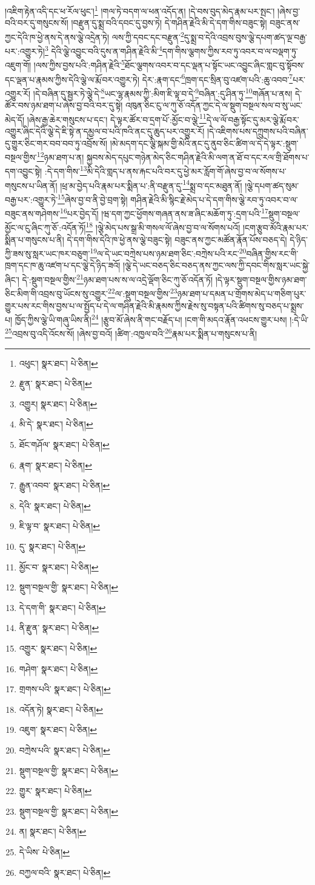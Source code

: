 །འཇིག་རྟེན་འདི་དང་ཕ་རོལ་ཕུང་།\footnote{འཕུང་།  སྣར་ཐང་།  པེ་ཅིན། } །གལ་ཏེ་བདག་ལ་ཕན་འདོད་ན། །དེ་བས་བུད་མེད་རྣམ་པར་སྤང་། །ཞེས་བྱ་བའི་བར་དུ་གསུངས་སོ། །བརྫུན་དུ་སྨྲ་བའི་དབང་དུ་བྱས་ཏེ། དེ་གཤིན་རྗེའི་མི་དེ་དག་གིས་བཟུང་སྟེ། བཟུང་ནས་ཀྱང་དེའི་ཁ་ཕྱེ་ནས་དེ་ནས་ལྕེ་འདྲེན་ཏེ། ལས་ཀྱི་དབང་དང་བརྫུན་\footnote{རྫུན་  སྣར་ཐང་།  པེ་ཅིན། }དུ་སྨྲ་བ་དེའི་འབྲས་བུས་ལྕེ་དཔག་ཚད་ལྔ་བརྒྱ་པར་:འགྱུར་ཏེ།\footnote{འགྱུར།  སྣར་ཐང་།  པེ་ཅིན། } དེའི་ལྕེ་འབྱུང་བའི་དུས་ན་གཤིན་རྗེའི་མི་\footnote{མི་དེ་  སྣར་ཐང་།  པེ་ཅིན། }དག་གིས་ལྕགས་ཀྱིས་རབ་ཏུ་འབར་བ་ལ་བལྡག་ཏུ་འཇུག་གོ། །ལས་ཀྱིས་བྱས་པའི་:གཤིན་རྗེའི་\footnote{ཐོང་གཤོལ་  སྣར་ཐང་།  པེ་ཅིན། }ཐོང་ལྕགས་འབར་བ་དང་ལྡན་པ་སྟོང་ཡང་འབྱུང་ཞིང་གླང་བུ་སྟོབས་དང་ལྡན་པ་རྣམས་ཀྱིས་དེའི་ལྕེ་ལ་རྨོ་བར་འགྱུར་ཏེ། དེར་:རྣག་དང་\footnote{རྣག་  སྣར་ཐང་།  པེ་ཅིན། }ཁྲག་དང་སྲིན་བུ་འཛག་པའི་:ཆུ་འབབ་\footnote{རྒྱུན་འབབ་  སྣར་ཐང་།  པེ་ཅིན། }པར་འགྱུར་རོ། །དེ་བཞིན་དུ་སྦྱར་ཏེ་ལྕེ་དེ་\footnote{དེའི་  སྣར་ཐང་།  པེ་ཅིན། }ཡང་ལྷ་རྣམས་ཀྱི་:མིག་ཇི་ལྟ་བ་དེ་\footnote{ཇི་ལྟ་བ་  སྣར་ཐང་།  པེ་ཅིན། }བཞིན་:དུ་ཤིན་ཏུ་\footnote{དུ་  སྣར་ཐང་།  པེ་ཅིན། }གཞོན་པ་ནས། དེ་ཚོར་བས་ཉམ་ཐག་པ་ཞེས་བྱ་བའི་བར་དུ་སྟེ། འཁུན་ཅིང་ངུ་ལ་ཀུ་ཅོ་འདོན་ཀྱང་དེ་ལ་སྡུག་བསྔལ་སལ་བ་སུ་ཡང་མེད་དོ། །ཞེས་རྒྱ་ཆེར་གསུངས་པ་དང་། དེ་ལྟར་ཚོར་བ་དྲག་པོ་:མྱོང་བ་ལྕེ་\footnote{མྱོང་བ་  སྣར་ཐང་།  པེ་ཅིན། }དེ་ལ་ལོ་བརྒྱ་སྟོང་དུ་མར་ལྕེ་རྨོ་བར་འགྱུར་ཞིང་དེའི་ལྕེ་དེ་ཇི་སྟེ་ན་དམྱལ་བ་པའི་ཁའི་ནང་དུ་ཆུད་པར་འགྱུར་རོ། །དེ་འཇིགས་པས་དཀྲུགས་པའི་བཞིན་དུ་གྱུར་ཅིང་གར་བབ་བབ་ཏུ་འབྲོས་སོ། །མེ་མདག་དང་ལྕི་སྐམ་གྱི་མེའི་ནང་དུ་ནུབ་ཅིང་ཚིག་ལ་དེ་དེ་ལྟར་:སྡུག་བསྔལ་གྱིས་\footnote{སྡུག་བསྔལ་གྱི་  སྣར་ཐང་།  པེ་ཅིན། }ཉམ་ཐག་པ་ན། སྐྱབས་མེད་དཔུང་གཉེན་མེད་ཅིང་གཤིན་རྗེའི་མི་ལག་ན་ཐོ་བ་དང་རལ་གྲི་ཐོགས་པ་དག་འབྱུང་སྟེ། :དེ་དག་གིས་\footnote{དེ་དག་གི་  སྣར་ཐང་།  པེ་ཅིན། }མི་དེའི་གླད་པ་ནས་རྐང་པའི་བར་དུ་ཕྱེ་མར་རློག་གོ་ཞེས་བྱ་བ་ལ་སོགས་པ་གསུངས་པ་ཡིན་ནོ། །ཕྲ་མ་བྱེད་པའི་རྣམ་པར་སྨིན་པ་:ནི་བརྫུན་དུ་\footnote{ནི་རྫུན་  སྣར་ཐང་།  པེ་ཅིན། }སྨྲ་བ་དང་མཐུན་ནོ། །ལྕེ་དཔག་ཚད་སུམ་བརྒྱ་པར་:འགྱུར་ཏེ་\footnote{འགྱུར་  སྣར་ཐང་།  པེ་ཅིན། }ཞེས་བྱ་བ་ནི་བྱེ་བྲག་སྟེ། གཤིན་རྗེའི་མི་སྙིང་རྗེ་མེད་པ་དེ་དག་གིས་ལྕེ་རབ་ཏུ་འབར་བ་ལ་བཟུང་ནས་གཤེགས་\footnote{གཤེག་  སྣར་ཐང་།  པེ་ཅིན། }པར་བྱེད་དོ། །ཝ་དག་ཀྱང་ཕྱོགས་གཞན་ནས་ཟ་ཞིང་མཆོག་ཏུ་:དྲག་པའི་\footnote{གྲགས་པའི་  སྣར་ཐང་།  པེ་ཅིན། }སྡུག་བསྔལ་མྱོང་ལ་ངུ་ཞིང་ཀུ་ཅོ་:འདོན་ཏོ།\footnote{འདོན་ཏེ།  སྣར་ཐང་།  པེ་ཅིན། } །ལྕེ་མེད་པས་སྒྲ་མི་གསལ་ལོ་ཞེས་བྱ་བ་ལ་སོགས་པའོ། །ངག་རྩུབ་མོའི་རྣམ་པར་སྨིན་པ་གསུངས་པ་ནི། དེ་དག་གིས་དེའི་ཁ་ཕྱེ་ནས་ལྕེ་བཟུང་སྟེ། བཟུང་ནས་ཀྱང་མཚོན་རྣོན་པོས་བཅད་དེ། དེ་ཉིད་ཀྱི་ཟས་སུ་སླར་ཡང་ཁར་བཅུག་\footnote{འཇུག་  སྣར་ཐང་།  པེ་ཅིན། }ལ་དེ་ཡང་བཀྲེས་པས་ཉམ་ཐག་ཅིང་:བཀྲེས་པའི་རང་\footnote{བཀྲེས་པའི་  སྣར་ཐང་།  པེ་ཅིན། }བཞིན་གྱིས་རང་གི་ཁྲག་དང་ཁ་ཆུ་འཛག་པ་དང་ལྕེ་དེ་ཉིད་ཟའོ། །ལྕེ་དེ་ཡང་བཅད་ཅིང་བཅད་ནས་ཀྱང་ལས་ཀྱི་དབང་གིས་སླར་ཡང་སྐྱེ་ཞིང་། དེ་:སྡུག་བསྔལ་གྱིས་\footnote{སྡུག་བསྔལ་གྱི་  སྣར་ཐང་།  པེ་ཅིན། }ཉམ་ཐག་པས་ས་ལ་འདྲེ་ལྡོག་ཅིང་ཀུ་ཅོ་འདོན་ཏོ། །དེ་ལྟར་སྡུག་བསྔལ་གྱིས་ཉམ་ཐག་ཅིང་མིག་གི་འབྲས་བུ་ཡོངས་སུ་འགྱུར་\footnote{གྱུར་  སྣར་ཐང་།  པེ་ཅིན། }ལ་:སྡུག་བསྔལ་གྱིས་\footnote{སྡུག་བསྔལ་གྱི་  སྣར་ཐང་།  པེ་ཅིན། }ཉམ་ཐག་པ་དམན་པ་གྲོགས་མེད་པ་གཅིག་པུར་གྱུར་པས་རང་གིས་བྱས་པ་ལ་སྤྱོད་པ་དེ་ལ་གཤིན་རྗེའི་མི་རྣམས་ཀྱིས་རྗེས་སུ་བསྟན་པའི་ཚིགས་སུ་བཅད་པ་སྨྲས་པ། ཁྱོད་ཀྱིས་ལྕེ་ཡི་གཞུ་ཡིས་ནི།\footnote{ན།  སྣར་ཐང་།  པེ་ཅིན། } །རྩུབ་མོ་ཞེས་ནི་གང་བརྗོད་པ། །ངག་གི་མདའ་རྣོན་འཕངས་གྱུར་པས། །:དེ་ཡི་\footnote{དེ་ཡིས་  པེ་ཅིན། }འབྲས་བུ་འདི་འོངས་སོ། །ཞེས་བྱ་བའོ། །ཚིག་:འཁྱལ་བའི་\footnote{བཀྱལ་བའི་  སྣར་ཐང་།  པེ་ཅིན། }རྣམ་པར་སྨིན་པ་གསུངས་པ་ནི། 